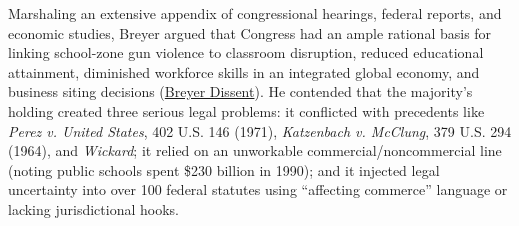 \documentclass[12pt]{article}
\begin{document}
Marshaling an extensive appendix of congressional hearings, federal reports, and economic studies, Breyer argued that Congress had an ample rational basis for linking school-zone gun violence to classroom disruption, reduced educational attainment, diminished workforce skills in an integrated global economy, and business siting decisions (\href{https://www.law.cornell.edu/supct/html/93-1260.ZD2.html}{Breyer Dissent}). He contended that the majority's holding created three serious legal problems: it conflicted with precedents like \textit{Perez v. United States}, 402 U.S. 146 (1971), \textit{Katzenbach v. McClung}, 379 U.S. 294 (1964), and \textit{Wickard}; it relied on an unworkable commercial/noncommercial line (noting public schools spent \$230 billion in 1990); and it injected legal uncertainty into over 100 federal statutes using ``affecting commerce'' language or lacking jurisdictional hooks.
\end{document}
